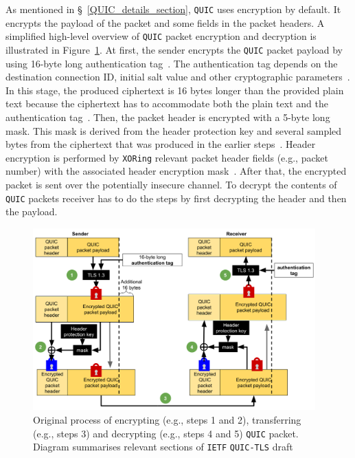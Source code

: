 \documentclass[12pt,a4paper,twoside,openright]{report}
\begin{document}
As mentioned in \S~\ref{QUIC_details_section}, \texttt{QUIC} uses encryption by default.
It encrypts the payload of the packet and some fields in the packet headers.
A simplified high-level overview of \texttt{QUIC} packet encryption and decryption is illustrated in Figure~\ref{fig:Cryptographic_procedures_of_quic}.
At first, the sender encrypts the \texttt{QUIC} packet payload by using 16-byte long authentication tag~\cite[Section 5]{ietf-quic-tls-32}. 
The authentication tag depends on the destination connection ID, initial salt value and other cryptographic parameters~\cite[Section 5]{ietf-quic-tls-32}.
In this stage, the produced ciphertext is 16 bytes longer than the provided plain text because the ciphertext has to accommodate both the plain text and the authentication tag~\cite[Section 5.3]{ietf-quic-tls-32}.
Then, the packet header is encrypted with a 5-byte long mask.
This mask is derived from the header protection key and several sampled bytes from the ciphertext that was produced in the earlier steps~\cite[Section 5]{ietf-quic-tls-32}. 
Header encryption is performed by \texttt{XORing} relevant packet header fields (e.g., packet number) with the associated header encryption mask~\cite[Section 5]{ietf-quic-tls-32}.
After that, the encrypted packet is sent over the potentially insecure channel.
To decrypt the contents of \texttt{QUIC} packets receiver has to do the steps by first decrypting the header and then the payload.

    \begin{figure}[H]
    \centering
    \includegraphics[width=0.97\textwidth]{figs/Cryptographic_procedures_of_quic.png}
    \caption[Original process of encrypting, transferring and decrypting \texttt{QUIC} packet]{Original process of encrypting (e.g., steps 1 and 2), transferring  (e.g., steps 3) and decrypting (e.g., steps 4 and 5) \texttt{QUIC} packet. Diagram summarises relevant sections of \texttt{IETF} \texttt{QUIC-TLS} draft~\cite[Section 5]{ietf-quic-tls-32}}
    \label{fig:Cryptographic_procedures_of_quic}
    \end{figure}
\end{document}
